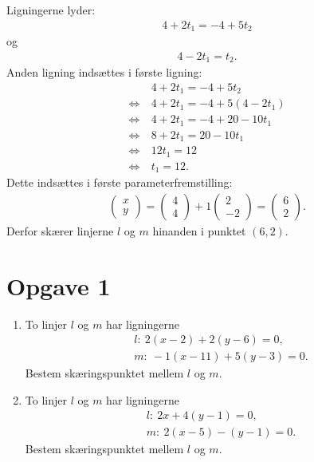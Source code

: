 \begin{exa}
	Ligningerne lyder:
	\begin{align*}
		4 + 2t_1 = -4+5t_2
	\end{align*} og
	\begin{align*}
		4-2t_1 = t_2.
	\end{align*}
	Anden ligning indsættes i første ligning:
	\begin{align*}
		&4 + 2t_1 = -4+5t_2\\
		\Leftrightarrow \ &4 + 2t_1 = -4+5(4-2t_1)\\
		\Leftrightarrow \ &4+2t_1 = -4+20-10t_1\\
		\Leftrightarrow \ &8+2t_1 = 20-10t_1\\
		\Leftrightarrow \ &12t_1 = 12\\
		\Leftrightarrow \ &t_1 = 12.
	\end{align*}
	Dette indsættes i første parameterfremstilling:
	\begin{align*}
		\begin{pmatrix}
			x \\ y
		\end{pmatrix} = 
		\begin{pmatrix}
			4 \\ 4 
		\end{pmatrix} 
		+ 1
		\begin{pmatrix}
			2 \\ -2
		\end{pmatrix} = 
		\begin{pmatrix}
			6 \\ 2
		\end{pmatrix}.
	\end{align*}
	Derfor skærer linjerne $l$ og $m$ hinanden i punktet $(6,2)$. 
\end{exa}

\section*{Opgave 1}
\begin{enumerate}[label=\roman*)]
	\item To linjer $l$ og $m$ har ligningerne
	\begin{align*}
		&l: \ 2(x-2) + 2(y-6) = 0,\\
		&m: \ -1(x-11) + 5(y-3) = 0.
	\end{align*}
	Bestem skæringspunktet mellem $l$ og $m$. 
	\item To linjer $l$ og $m$ har ligningerne 
	\begin{align*}
		&l: \ 2x + 4(y-1) = 0,\\
		&m: \ 2(x-5) -(y-1) = 0.
	\end{align*}
	Bestem skæringspunktet mellem $l$ og $m$.
\end{enumerate}

